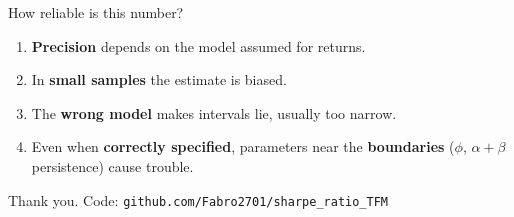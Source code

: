 \documentclass[aspectratio=169,10pt]{beamer}
\begin{document}
\begin{frame}{How reliable is this number?}
  \begin{enumerate}
    \item \textbf{Precision} depends on the model assumed for returns.
    \item In \textbf{small samples} the estimate is biased.
    \item The \textbf{wrong model} makes intervals lie, usually too narrow.
    \item Even when \textbf{correctly specified}, parameters near the \textbf{boundaries}
          ($\phi$, $\alpha+\beta$ persistence) cause trouble.
  \end{enumerate}



  \vfill
  {\footnotesize Thank you.\hfill
   Code: \texttt{github.com/Fabro2701/sharpe\_ratio\_TFM}}
\end{frame}


\end{document}
